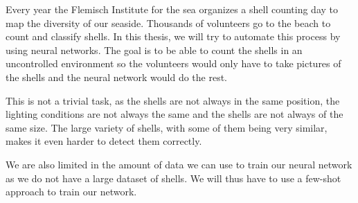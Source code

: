 Every year the Flemisch Institute for the sea organizes a shell counting day to map the diversity of our seaside. 
Thousands of volunteers go to the beach to count and classify shells. 
In this thesis, we will try to automate this process by using neural networks.
The goal is to be able to count the shells in an uncontrolled environment so the volunteers would only have to take pictures of the shells and the neural network would do the rest.

This is not a trivial task, as the shells are not always in the same position, the lighting conditions are not always the same and the shells are not always of the same size.
The large variety of shells, with some of them being very similar, makes it even harder to detect them correctly.

We are also limited in the amount of data we can use to train our neural network as we do not have a large dataset of shells. We will thus have to use a few-shot approach to train our network.